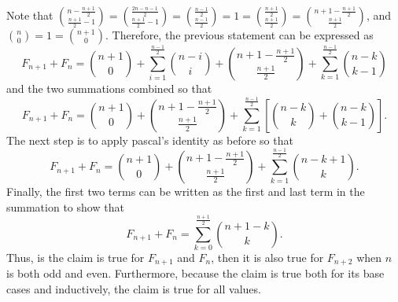 \documentclass{article}
\begin{document}
Note that $\displaystyle {n - \frac{n+1}{2} \choose \frac{n+1}{2} - 1} = {\frac{2n - n - 1}{2} \choose \frac{n+1}{2} - 1} = {\frac{n - 1}{2} \choose \frac{n - 1}{2}} = 1 = {\frac{n + 1}{2} \choose \frac{n + 1}{2}} = {n + 1 - \frac{n+1}{2} \choose \frac{n+1}{2}}$, and $\displaystyle {n \choose 0} = 1 = {n+1 \choose 0}$. Therefore, the previous statement can be expressed as
\begin{equation*}
F_{n+1} + F_n = {n+1 \choose 0} + \sum_{i=1}^{\frac{n - 1}{2}} {n-i\choose i} + {n+1 - \frac{n+1}{2} \choose \frac{n+1}{2}} + \sum_{k=1}^{\frac{n-1}{2}} {n-k \choose k - 1}
\end{equation*}
and the two summations combined so that
\begin{equation*}
F_{n+1} + F_n = {n+1 \choose 0} + {n+1 - \frac{n+1}{2} \choose \frac{n+1}{2}} + \sum_{k=1}^{\frac{n - 1}{2}} \left [ {n-k\choose k} +  {n-k \choose k - 1} \right ].
\end{equation*}
The next step is to apply pascal's identity as before so that
\begin{equation*}
F_{n+1} + F_n = {n+1 \choose 0} + {n+1 - \frac{n+1}{2} \choose \frac{n+1}{2}} + \sum_{k=1}^{\frac{n - 1}{2}} {n - k + 1\choose k}.
\end{equation*}
Finally, the first two terms can be written as the first and last term in the summation to show that
\begin{equation*}
F_{n+1} + F_n = \sum_{k=0}^{\frac{n + 1}{2}} {n + 1 - k\choose k}.
\end{equation*}
Thus, is the claim is true for $F_{n+1}$ and $F_{n}$, then it is also true for $F_{n+2}$ when $n$ is both odd and even.  Furthermore, because the claim is true both for its base cases and inductively, the claim is true for all values.
\end{document}
